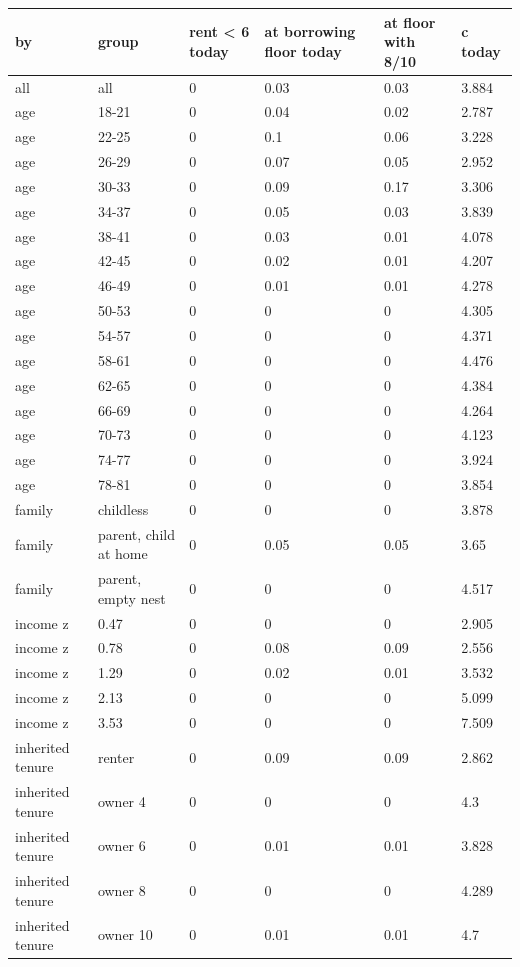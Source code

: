 \begingroup\small
\setlength{\tabcolsep}{3pt}
\renewcommand{\arraystretch}{1.04}
\begin{tabularx}{\linewidth}{XXXXXX}
\toprule
by & group & rent \textless{} 6 today & at borrowing floor today & at floor with 8/10 & c today \\
\midrule
all & all & 0 & 0.03 & 0.03 & 3.884 \\
age & 18-21 & 0 & 0.04 & 0.02 & 2.787 \\
age & 22-25 & 0 & 0.1 & 0.06 & 3.228 \\
age & 26-29 & 0 & 0.07 & 0.05 & 2.952 \\
age & 30-33 & 0 & 0.09 & 0.17 & 3.306 \\
age & 34-37 & 0 & 0.05 & 0.03 & 3.839 \\
age & 38-41 & 0 & 0.03 & 0.01 & 4.078 \\
age & 42-45 & 0 & 0.02 & 0.01 & 4.207 \\
age & 46-49 & 0 & 0.01 & 0.01 & 4.278 \\
age & 50-53 & 0 & 0 & 0 & 4.305 \\
age & 54-57 & 0 & 0 & 0 & 4.371 \\
age & 58-61 & 0 & 0 & 0 & 4.476 \\
age & 62-65 & 0 & 0 & 0 & 4.384 \\
age & 66-69 & 0 & 0 & 0 & 4.264 \\
age & 70-73 & 0 & 0 & 0 & 4.123 \\
age & 74-77 & 0 & 0 & 0 & 3.924 \\
age & 78-81 & 0 & 0 & 0 & 3.854 \\
family & childless & 0 & 0 & 0 & 3.878 \\
family & parent, child at home & 0 & 0.05 & 0.05 & 3.65 \\
family & parent, empty nest & 0 & 0 & 0 & 4.517 \\
income z & 0.47 & 0 & 0 & 0 & 2.905 \\
income z & 0.78 & 0 & 0.08 & 0.09 & 2.556 \\
income z & 1.29 & 0 & 0.02 & 0.01 & 3.532 \\
income z & 2.13 & 0 & 0 & 0 & 5.099 \\
income z & 3.53 & 0 & 0 & 0 & 7.509 \\
inherited tenure & renter & 0 & 0.09 & 0.09 & 2.862 \\
inherited tenure & owner 4 & 0 & 0 & 0 & 4.3 \\
inherited tenure & owner 6 & 0 & 0.01 & 0.01 & 3.828 \\
inherited tenure & owner 8 & 0 & 0 & 0 & 4.289 \\
inherited tenure & owner 10 & 0 & 0.01 & 0.01 & 4.7 \\
\bottomrule
\end{tabularx}
\endgroup
